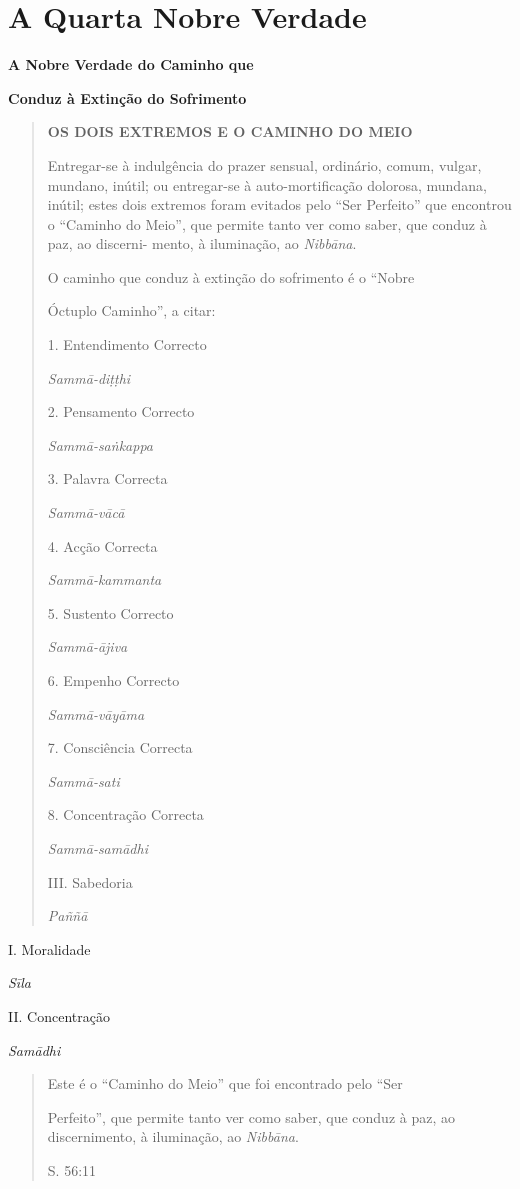 \chapter{A Quarta Nobre Verdade}

\textbf{A Nobre Verdade do Caminho que}

\textbf{Conduz à Extinção do Sofrimento}

\begin{quote}
\textbf{OS DOIS EXTREMOS E O CAMINHO DO MEIO}

Entregar-se à indulgência do prazer sensual, ordinário, comum, vulgar, mundano, inútil; ou entregar-se à auto-mortificação dolorosa, mundana, inútil; estes dois extremos foram evitados pelo ``Ser Perfeito'' que encontrou o ``Caminho do Meio'', que permite tanto ver como saber, que conduz à paz, ao discerni- mento, à iluminação, ao \emph{Nibbāna}.

O caminho que conduz à extinção do sofrimento é o ``Nobre

Óctuplo Caminho'', a citar:

1. Entendimento Correcto

\emph{Sammā-diṭṭhi}

2. Pensamento Correcto

\emph{Sammā-saṅkappa}

3. Palavra Correcta

\emph{Sammā-vācā}

4. Acção Correcta

\emph{Sammā-kammanta}

5. Sustento Correcto

\emph{Sammā-ājiva}

6. Empenho Correcto

\emph{Sammā-vāyāma}

7. Consciência Correcta

\emph{Sammā-sati}

8. Concentração Correcta

\emph{Sammā-samādhi}

III. Sabedoria

\emph{Paññā}
\end{quote}

I. Moralidade

\emph{Sīla}

II. Concentração

\emph{Samādhi}

\begin{quote}
Este é o ``Caminho do Meio'' que foi encontrado pelo ``Ser

Perfeito'', que permite tanto ver como saber, que conduz à paz, ao discernimento, à iluminação, ao \emph{Nibbāna}.

S. 56:11
\end{quote}

